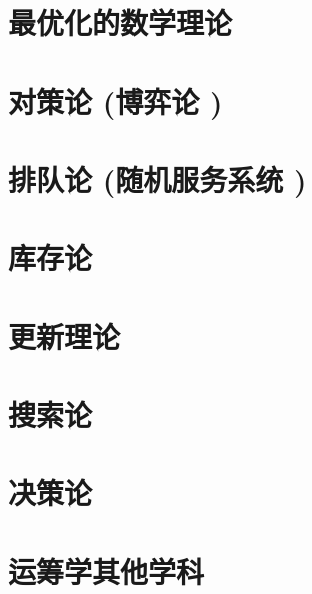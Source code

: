 \documentclass[UTF8]{../09-Mathematics}
\begin{document}
\chapter{最优化的数学理论}
\chapter{对策论 (博弈论 )}
\chapter{排队论 (随机服务系统 )}

\chapter{库存论}
\chapter{更新理论}
\chapter{搜索论}



\chapter{决策论}
\chapter{运筹学其他学科}
\end{document}
